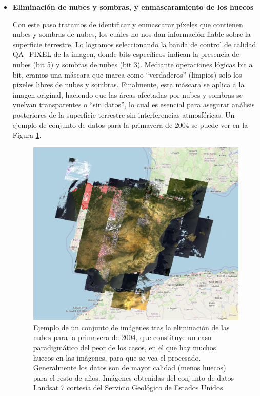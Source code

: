 \begin{itemize}
    \item \textbf{Eliminación de nubes y sombras, y enmascaramiento de los huecos}

    Con este paso tratamos de identificar y enmascarar píxeles que contienen nubes y sombras de nubes, los cuáles no nos dan información fiable sobre la superficie terrestre. Lo logramos seleccionando la banda de control de calidad QA\_PIXEL de la imagen, donde bits específicos indican la presencia de nubes (bit 5) y sombras de nubes (bit 3). Mediante operaciones lógicas bit a bit, cramos una máscara que marca como ``verdaderos'' (limpios) solo los píxeles libres de nubes y sombras. Finalmente, esta máscara se aplica a la imagen original, haciendo que las áreas afectadas por nubes y sombras se vuelvan transparentes o ``sin datos'', lo cual es esencial para asegurar análisis posteriores de la superficie terrestre sin interferencias atmosféricas. Un ejemplo de conjunto de datos para la primavera de $2004$ se puede ver en la Figura \ref{fig:imagenes_sat_primavera_2004}.

    \begin{figure}[H]
        \centering
        \includegraphics[width=0.7\linewidth]{figuras/ejemplo_imagen_sat_mala_calidad.png}
        \caption{Ejemplo de un conjunto de imágenes tras la eliminación de las nubes para la primavera de $2004$, que constituye un caso paradigmático del peor de los casos, en el que hay muchos huecos en las imágenes, para que se vea el procesado. Generalmente los datos son de mayor calidad (menos huecos) para el resto de años. Imágenes obtenidas del conjunto de datos Landsat 7 cortesía del Servicio Geológico de Estados Unidos.}
        \label{fig:imagenes_sat_primavera_2004}
    \end{figure}



\end{itemize}
